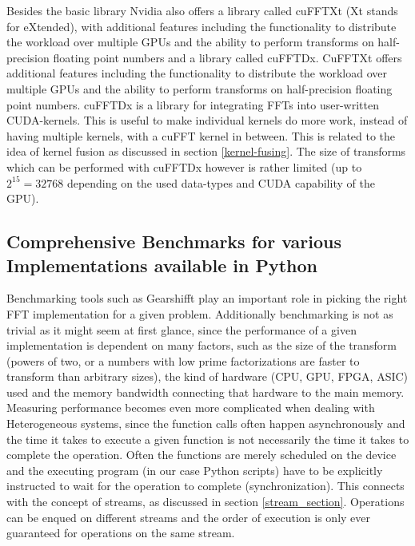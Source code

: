 \documentclass[english,11pt,a4paper,table]{article} %
\begin{document}
Besides the basic library Nvidia also offers a library called cuFFTXt (Xt stands for eXtended), with additional features including the functionality to distribute the workload over multiple GPUs and the ability to perform transforms on half-precision floating point numbers and a library called cuFFTDx.
CuFFTXt offers additional features including the functionality to distribute the workload over multiple GPUs and the ability to perform transforms on half-precision floating point numbers.
cuFFTDx is a library for integrating FFTs into user-written CUDA-kernels.
This is useful to make individual kernels do more work, instead of having multiple kernels, with a cuFFT kernel in between.
This is related to the idea of kernel fusion as discussed in section \ref{kernel-fusing}.
The size of transforms which can be performed with cuFFTDx however is rather limited (up to $2^{15}=32768$ depending on the used data-types and CUDA capability of the GPU).

\subsection{Comprehensive Benchmarks for various Implementations available in Python}

Benchmarking tools such as Gearshifft \cite{10.1007/978-3-319-58667-0_11} play an important role in picking the right FFT implementation for a given problem.
Additionally benchmarking is not as trivial as it might seem at first glance, since the performance of a given implementation is dependent on many factors, such as the size of the transform (powers of two, or a numbers with low prime factorizations are faster to transform than arbitrary sizes), the kind of hardware (CPU, GPU, FPGA, ASIC) used and the memory bandwidth connecting that hardware to the main memory.
Measuring performance becomes even more complicated when dealing with Heterogeneous systems, since the function calls often happen asynchronously and the time it takes to execute a given function is not necessarily the time it takes to complete the operation.
Often the functions are merely scheduled on the device and the executing program (in our case Python scripts) have to be explicitly instructed to wait for the operation to complete (synchronization).
This connects with the concept of streams, as discussed in section \ref{stream_section}.
Operations can be enqued on different streams and the order of execution is only ever guaranteed for operations on the same stream.
\end{document}
